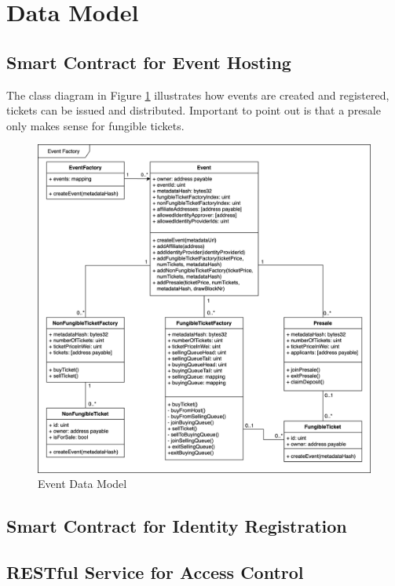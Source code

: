 \section{Data Model}


\subsection{Smart Contract for Event Hosting}
The class diagram in Figure \ref{fig:event-data-model} illustrates how events are created and registered, tickets can be issued and distributed. Important to point out is that a presale only makes sense for fungible tickets. 
\begin{figure}[H]
    \centering
    \includegraphics[width=16cm]{design/diagrams/event-factory-class-diagramm.png}
    \caption{Event Data Model}
    \label{fig:event-data-model}
\end{figure}

\subsection{Smart Contract for Identity Registration}

\subsection{RESTful Service for Access Control}